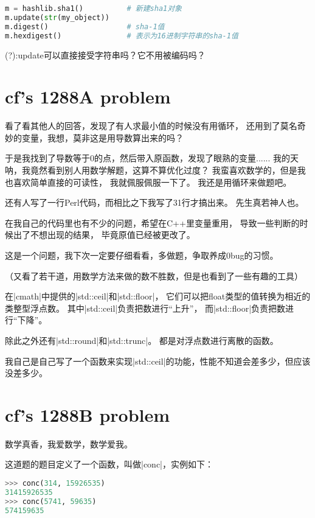 \begin{lstlisting}[language=Python]
m = hashlib.sha1()          # 新建sha1对象
m.update(str(my_object))
m.digest()                  # sha-1值
m.hexdigest()               # 表示为16进制字符串的sha-1值
\end{lstlisting}

(?):update可以直接接受字符串吗？它不用被编码吗？


\section{cf's 1288A problem}

看了看其他人的回答，发现了有人求最小值的时候没有用循环，
还用到了莫名奇妙的变量，我想，莫非这是用导数算出来的吗？

于是我找到了导数等于0的点，然后带入原函数，发现了眼熟的变量......
我的天呐，我竟然看到别人用数学解题，这算不算优化过度？
我蛮喜欢数学的，但是我也喜欢简单直接的可读性，
我就佩服佩服一下了。
我还是用循环来做题吧。

还有人写了一行Perl代码，而相比之下我写了31行才搞出来。
先生真若神人也。

在我自己的代码里也有不少的问题，希望在C++里变量重用，
导致一些判断的时候出了不想出现的结果，
毕竟原值已经被更改了。

这是一个问题，我下次一定要仔细看看，多做题，争取养成0bug的习惯。

（又看了若干道，用数学方法来做的数不胜数，但是也看到了一些有趣的工具）

在\vb|cmath|中提供的\vb|std::ceil|和\vb|std::floor|，
它们可以把float类型的值转换为相近的类整型浮点数。
其中\vb|std::ceil|负责把数进行``上升''，
而\vb|std::floor|负责把数进行``下降''。

除此之外还有\vb|std::round|和\vb|std::trunc|。
都是对浮点数进行离散的函数。

我自己是自己写了一个函数来实现\vb|std::ceil|的功能，性能不知道会差多少，但应该没差多少。


\section{cf's 1288B problem}

数学真香，我爱数学，数学爱我。

这道题的题目定义了一个函数，叫做\vb|conc|，实例如下：

\begin{lstlisting}[language=python]
>>> conc(314, 15926535)
31415926535
>>> conc(5741, 59635)
574159635
\end{lstlisting}

